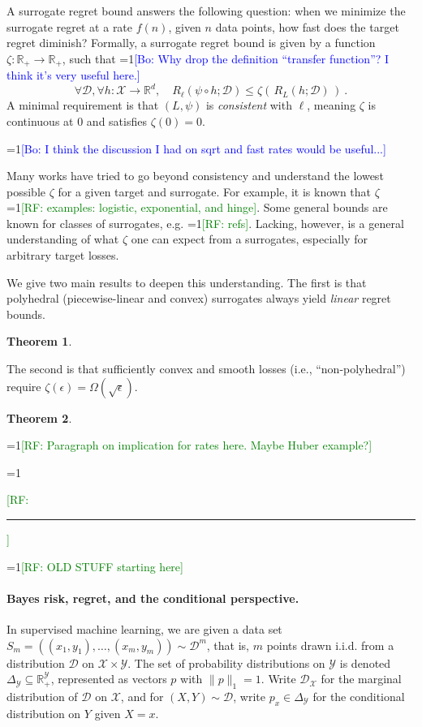 \documentclass{article}
\newtheorem{theorem}{Theorem}
\newcommand{\Comments}{1}
\newcommand{\mynote}[2]{\ifnum\Comments=1\textcolor{#1}{#2}\fi}
\newcommand{\raf}[1]{\mynote{green}{[RF: #1]}}
\newcommand{\bo}[1]{\mynote{blue}{[Bo: #1]}}
\newcommand{\reals}{\mathbb{R}}
\newcommand{\simplex}{\Delta_\Y}
\newcommand{\D}{\mathcal{D}}
\newcommand{\X}{\mathcal{X}}
\newcommand{\Y}{\mathcal{Y}}
\begin{document}
A surrogate regret bound answers the following question: when we minimize the surrogate regret at a rate $f(n)$, given $n$ data points, how fast does the target regret diminish?
Formally, a surrogate regret bound is given by a function $\zeta : \reals_+ \to \reals_+$, such that
\bo{Why drop the definition ``transfer function''? I think it's very useful here.}
\begin{equation}
  \label{eq:surrogate-regret-bound}
  \forall \D, \forall h:\X\to\reals^d, \quad R_\ell(\psi\circ h;\D) \leq \zeta(\, R_L(h;\D) \,)~.
\end{equation}
A minimal requirement is that $(L,\psi)$ is \emph{consistent} with $\ell$, meaning $\zeta$ is continuous at $0$ and satisfies $\zeta(0) = 0$.

\bo{I think the discussion I had on sqrt and fast rates would be useful...}

Many works have tried to go beyond consistency and understand the lowest possible $\zeta$ for a given target and surrogate.
For example, it is known that $\zeta$ \raf{examples: logistic, exponential, and hinge}.
Some general bounds are known for classes of surrogates, e.g. \raf{refs}.
Lacking, however, is a general understanding of what $\zeta$ one can expect from a surrogates, especially for arbitrary target losses.

We give two main results to deepen this understanding.
The first is that polyhedral (piecewise-linear and convex) surrogates always yield \emph{linear} regret bounds.
\begin{theorem}
  
\end{theorem}
The second is that sufficiently convex and smooth losses (i.e., ``non-polyhedral'') require $\zeta(\epsilon) = \Omega(\sqrt{\epsilon})$.

\begin{theorem}
  
\end{theorem}

\raf{Paragraph on implication for rates here.  Maybe Huber example?}


\raf{\hrule}
\raf{OLD STUFF starting here}

\paragraph{Bayes risk, regret, and the conditional perspective.}
In supervised machine learning, we are given a data set $S_m = ((x_1,y_1), \dots, (x_m,y_m)) \sim \D^m$, that is, $m$ points drawn i.i.d. from a distribution $\D$ on $\X \times \Y$.
The set of probability distributions on $\Y$ is denoted $\simplex\subseteq\reals^{\Y}_+$, represented as vectors $p$ with $\|p\|_1 = 1$.
Write $\D_{\X}$ for the marginal distribution of $\D$ on $\X$, and for $(X,Y) \sim \D$, write $p_x \in \simplex$ for the conditional distribution on $Y$ given $X=x$.
\end{document}
